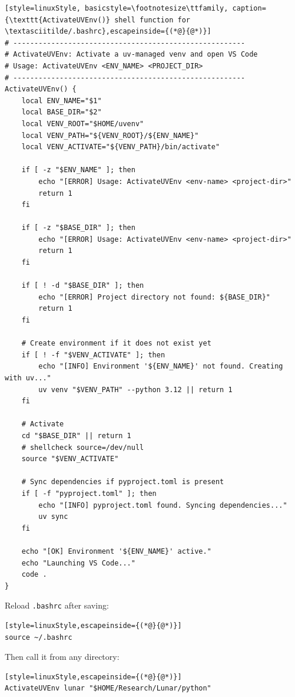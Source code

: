 \begin{lstlisting}[style=linuxStyle, basicstyle=\footnotesize\ttfamily, caption={\texttt{ActivateUVEnv()} shell function for \textasciitilde/.bashrc},escapeinside={(*@}{@*)}]
# -------------------------------------------------------
# ActivateUVEnv: Activate a uv-managed venv and open VS Code
# Usage: ActivateUVEnv <ENV_NAME> <PROJECT_DIR>
# -------------------------------------------------------
ActivateUVEnv() {
    local ENV_NAME="$1"
    local BASE_DIR="$2"
    local VENV_ROOT="$HOME/uvenv"
    local VENV_PATH="${VENV_ROOT}/${ENV_NAME}"
    local VENV_ACTIVATE="${VENV_PATH}/bin/activate"

    if [ -z "$ENV_NAME" ]; then
        echo "[ERROR] Usage: ActivateUVEnv <env-name> <project-dir>"
        return 1
    fi

    if [ -z "$BASE_DIR" ]; then
        echo "[ERROR] Usage: ActivateUVEnv <env-name> <project-dir>"
        return 1
    fi

    if [ ! -d "$BASE_DIR" ]; then
        echo "[ERROR] Project directory not found: ${BASE_DIR}"
        return 1
    fi

    # Create environment if it does not exist yet
    if [ ! -f "$VENV_ACTIVATE" ]; then
        echo "[INFO] Environment '${ENV_NAME}' not found. Creating with uv..."
        uv venv "$VENV_PATH" --python 3.12 || return 1
    fi

    # Activate
    cd "$BASE_DIR" || return 1
    # shellcheck source=/dev/null
    source "$VENV_ACTIVATE"

    # Sync dependencies if pyproject.toml is present
    if [ -f "pyproject.toml" ]; then
        echo "[INFO] pyproject.toml found. Syncing dependencies..."
        uv sync
    fi

    echo "[OK] Environment '${ENV_NAME}' active."
    echo "Launching VS Code..."
    code .
}
\end{lstlisting}

Reload \texttt{.bashrc} after saving:

\begin{lstlisting}[style=linuxStyle,escapeinside={(*@}{@*)}]
source ~/.bashrc
\end{lstlisting}

Then call it from any directory:

\begin{lstlisting}[style=linuxStyle,escapeinside={(*@}{@*)}]
ActivateUVEnv lunar "$HOME/Research/Lunar/python"
\end{lstlisting}


